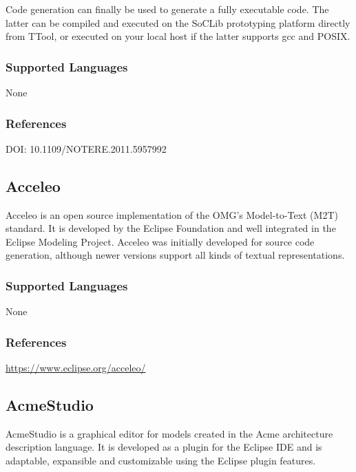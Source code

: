     Code generation can finally be used to generate a fully executable code. The latter can be compiled and executed on the SoCLib prototyping platform directly from TTool, or executed on your local host if the latter supports gcc and POSIX.

\subsubsection{Supported Languages}

None


\subsubsection{References}

DOI: 10.1109/NOTERE.2011.5957992





\subsection{Acceleo}
\label{subsecT:Acceleo}


Acceleo is an open source implementation of the OMG's Model-to-Text (M2T) standard. It is developed by the Eclipse Foundation and well integrated in the Eclipse Modeling Project. Acceleo was initially developed for source code generation, although newer versions support all kinds of textual representations.

\subsubsection{Supported Languages}

None


\subsubsection{References}

\url{https://www.eclipse.org/acceleo/}



\subsection{AcmeStudio}
\label{subsecT:AcmeStudio}


AcmeStudio is a graphical editor for models created in the Acme architecture description language. 
It is developed as a plugin for the Eclipse IDE and is adaptable, expansible and customizable using the Eclipse plugin features. 

